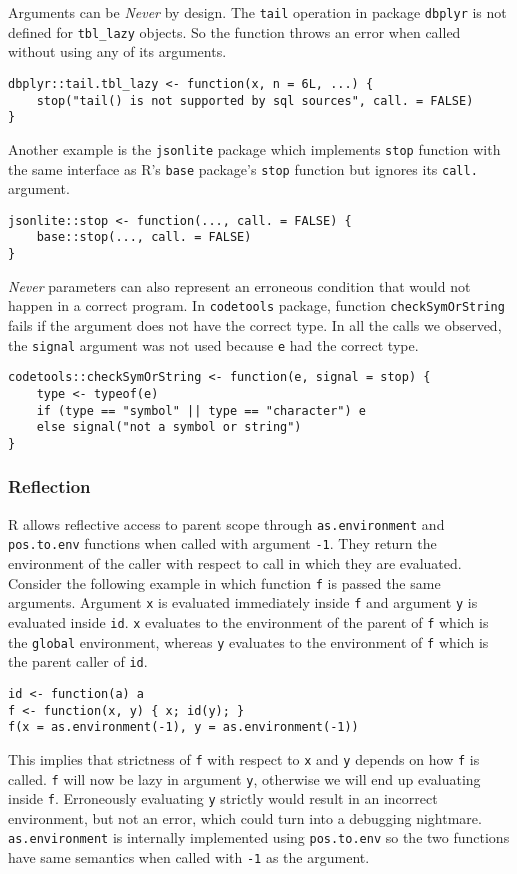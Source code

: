 \documentclass[review,nonacm,screen,acmsmall,anonymous=true]{acmart}
\newcommand{\never}{\emph{Never}\xspace}
\newcommand{\code}[1]{\lstinline |#1|\xspace}
\begin{document}
Arguments can be \never by design. The \code{tail} operation
in package \code{dbplyr} is not defined for \code{tbl_lazy} objects. So the
function throws an error when called without using any of its arguments.
\begin{lstlisting}
dbplyr::tail.tbl_lazy <- function(x, n = 6L, ...) {
    stop("tail() is not supported by sql sources", call. = FALSE)
}
\end{lstlisting}
%
Another example is the \code{jsonlite} package which implements \code{stop}
function with the same interface as R's \code{base} package's \code{stop}
function but ignores its \code{call.} argument.
\begin{lstlisting}
jsonlite::stop <- function(..., call. = FALSE) {
    base::stop(..., call. = FALSE)
}
\end{lstlisting}
%
\never parameters can also represent an erroneous condition that would not
happen in a correct program. In \code{codetools} package, function
\code{checkSymOrString} fails if the argument does not have the correct type. In
all the calls we observed, the \code{signal} argument was not used because
\code{e} had the correct type.
\begin{lstlisting}
codetools::checkSymOrString <- function(e, signal = stop) {
    type <- typeof(e)
    if (type == "symbol" || type == "character") e
    else signal("not a symbol or string")
}
\end{lstlisting}

\subsubsection{Reflection}

R allows reflective access to parent scope through \code{as.environment} and
\code{pos.to.env} functions when called with argument \code{-1}. They return the
environment of the caller with respect to call in which they are evaluated.
Consider the following example in which function \code{f} is passed the same
arguments. Argument \code{x} is evaluated immediately inside \code{f} and
argument \code{y} is evaluated inside \code{id}. \code{x} evaluates to the
environment of the parent of \code{f} which is the \code{global} environment,
whereas \code{y} evaluates to the environment of \code{f} which is the parent
caller of \code{id}.
%
\begin{lstlisting}
id <- function(a) a
f <- function(x, y) { x; id(y); }
f(x = as.environment(-1), y = as.environment(-1))
\end{lstlisting}
%
This implies that strictness of \code{f} with respect to \code{x} and \code{y}
depends on how \code{f} is called. \code{f} will now be lazy in argument
\code{y}, otherwise we will end up evaluating inside \code{f}. Erroneously
evaluating \code{y} strictly would result in an incorrect environment, but not
an error, which could turn into a debugging nightmare. \code{as.environment} is
internally implemented using \code{pos.to.env} so the two functions have same
semantics when called with \code{-1} as the argument.
\end{document}
